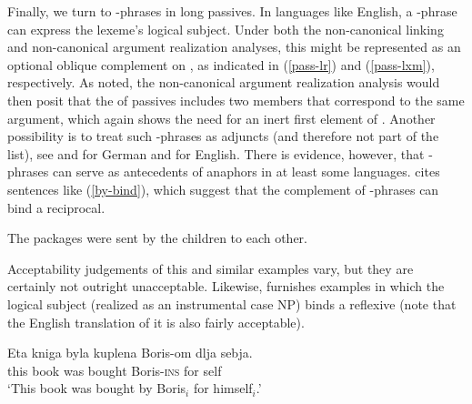 \documentclass[output=paper
	        ,collection
	        ,collectionchapter
 	        ,biblatex
                ,babelshorthands
                ,newtxmath
                ,draftmode
                ,colorlinks, citecolor=brown
]{langscibook}
\begin{document}

Finally, we turn to -phrases in long passives.
In languages like English, a -phrase can express the lexeme's logical subject.
Under both the non-canonical linking and non-canonical argument realization analyses, this might be represented as an optional oblique complement on \argst, as indicated in (\ref{pass-lr}) and (\ref{pass-lxm}), respectively.
As noted, the non-canonical argument realization analysis would then posit that the \argst of passives includes two members that correspond to the same argument, which again shows the need for an inert first element of \argst.
Another possibility is to treat such -phrases as adjuncts (and therefore not part of the \argst list), see \citet[Chapter 7]{Hoehle78a} and \citet[292--294]{Mueller2003e} for German and \citet[180]{Jackendoff1990} for English. 
There is evidence, however, that -phrases can serve as antecedents of anaphors in at least some languages.
\citet[111]{Collins2005} cites sentences like (\ref{by-bind}), which suggest that the complement of -phrases can bind a reciprocal.

\begin{exe}
\ex\label{by-bind}The packages were sent by the children to each other.
\end{exe} 

Acceptability judgements of this and similar examples vary, but they are certainly not outright unacceptable.  Likewise, \citet[10]{Perlmutter1984} furnishes  examples in which the logical subject (realized as an instrumental case NP) binds a reflexive (note that the English translation of it is also fairly acceptable).

\begin{exe}
\ex     \label{arg-st:russian-pass}
\gll Eta kniga byla kuplena Boris-om dlja sebja.  \\
     this book was bought Boris-\textsc{ins} for self  \\
\glt `This book was bought by Boris$_{i}$ for himself$_{i}$.'
\end{exe}
\end{document}
